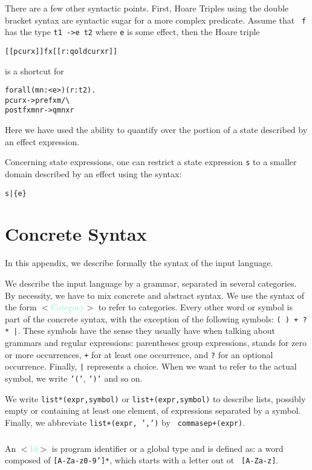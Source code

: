 \documentclass[a4paper]{scrreprt}
\newcommand{\likecat}[1]{$<$\textcolor{Aquamarine}{#1}$>$}
\newcommand{\catdef}[1]{\label{#1}\likecat{#1}}
\begin{document}
There are a few other syntactic points. First, Hoare Triples using the double
bracket syntax are syntactic sugar for a more complex predicate. Assume that {\tt
f} has the type {\tt t1 ->{e} t2} where {\tt e} is some effect, then the Hoare
triple
\begin{alltt}
    [[ p cur x ]] f x [[r : q old cur x r]]
\end{alltt}
is a shortcut for
\begin{alltt}
  forall (m n : <e>) (r : t2).
    p cur x -> pre f x m \verb|/\|
    post f x m n r -> q m n x r
\end{alltt}
Here we have used the ability to quantify over the portion of a state
described by an effect expression.

Concerning state expressions, one can restrict a state expression {\tt s} to a
smaller domain described by an effect using the syntax:
\begin{alltt}
s|\{e\}
\end{alltt}


\appendix

\chapter{Concrete Syntax}

In this appendix, we describe formally the syntax of the input language.

We describe the input language by a grammar, separated in several categories.
By necessity, we have to mix concrete and abstract syntax. We use the syntax
of the form \likecat{Category} to refer to categories. Every other word or symbol
is part of the concrete syntax, with the exception of the following symbols:
\texttt{( ) + ? * |}. These symbols have the sense they usually have when
talking about grammars and regular expressions: parentheses group expressions,
{\tt *} stands for zero or more occurrences, {\tt +} for at least one
occurrence, and {\tt ?} for an optional occurrence. Finally, {\tt |}
represents a choice.  When we want to refer to the actual symbol, we write
{\tt '('}, {\tt ')'} and so on.

We write {\tt list*(expr,symbol)} or {\tt list+(expr,symbol)} to describe
lists, possibly empty or containing at least one element, of expressions
separated by a symbol. Finally, we abbreviate {\tt list+(expr, ',')} by {\tt
commasep+(expr)}.

\paragraph{}
An \catdef{Id} is program identifier or a global type and is defined as: a word
composed of {\tt [A-Za-z0-9']*}, which starts with a letter out ot {\tt
[A-Za-z]}.
\end{document}
